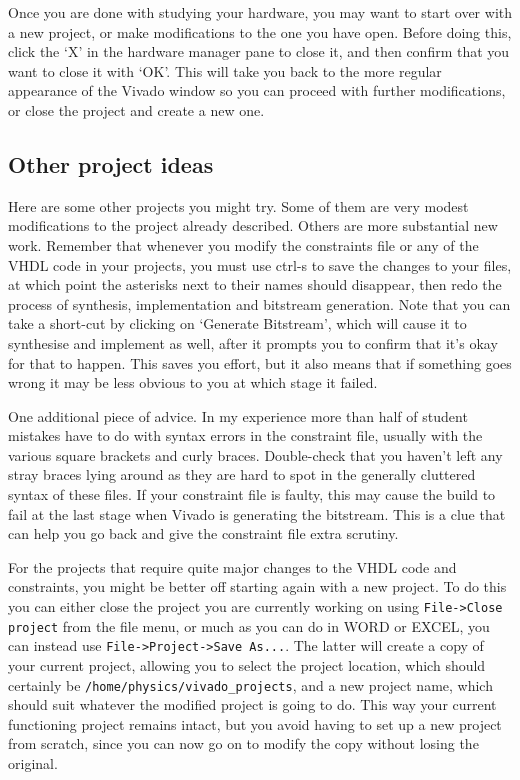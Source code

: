 \documentclass[../physical_computing.tex]{subfiles}
\begin{document}
Once you are done with studying your hardware, you may want to start over with a new project, or make modifications to the one you have open. Before doing this, click the `X' in the hardware manager pane to close it, and then confirm that you want to close it with `OK'. This will take you back to the more regular appearance of the Vivado window so you can proceed with further modifications, or close the project and create a new one.

\subsection{Other project ideas}
\label{sec:other_ideas}

Here are some other projects you might try. Some of them are very modest modifications to the project already described. Others are more substantial new work. Remember that whenever you modify the constraints file or any of the VHDL code in your projects, you must use ctrl-s to save the changes to your files, at which point the asterisks next to their names should disappear, then redo the process of synthesis, implementation and bitstream generation. Note that you can take a short-cut by clicking on `Generate Bitstream', which will cause it to synthesise and implement as well, after it prompts you to confirm that it's okay for that to happen. This saves you effort, but it also means that if something goes wrong it may be less obvious to you at which stage it failed.

One additional piece of advice. In my experience more than half of student mistakes have to do with syntax errors in the constraint file, usually with the various square brackets and curly braces. Double-check that you haven't left any stray braces lying around as they are hard to spot in the generally cluttered syntax of these files. If your constraint file is faulty, this may cause the build to fail at the last stage when Vivado is generating the bitstream. This is a clue that can help you go back and give the constraint file extra scrutiny.

For the projects that require quite major changes to the VHDL code and constraints, you might be better off starting again with a new project. To do this you can either close the project you are currently working on using \texttt{File->Close project} from the file menu, or much as you can do in WORD or EXCEL, you can instead use \texttt{File->Project->Save As...}. The latter will create a copy of your current project, allowing you to select the project location, which should certainly be \texttt{/home/physics/vivado\_projects}, and a new project name, which should suit whatever the modified project is going to do. This way your current functioning project remains intact, but you avoid having to set up a new project from scratch, since you can now go on to modify the copy without losing the original.
\end{document}
